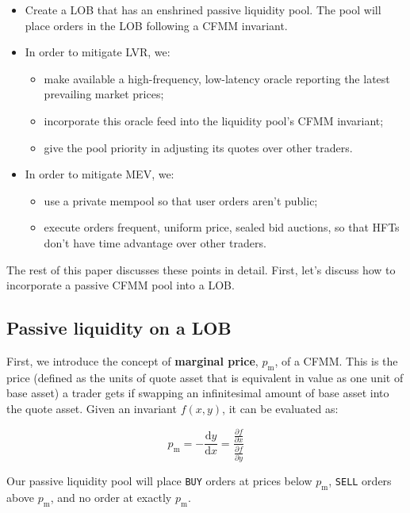 \documentclass{article}
\begin{document}
\begin{itemize}
  \item Create a LOB that has an enshrined passive liquidity pool. The pool will place orders in the LOB following a CFMM invariant.
  \item In order to mitigate LVR, we:
        \begin{itemize}
          \item make available a high-frequency, low-latency oracle reporting the latest prevailing market prices;
          \item incorporate this oracle feed into the liquidity pool's CFMM invariant;
          \item give the pool priority in adjusting its quotes over other traders.
        \end{itemize}
  \item In order to mitigate MEV, we:
        \begin{itemize}
          \item use a private mempool so that user orders aren't public;
          \item execute orders frequent, uniform price, sealed bid auctions, so that HFTs don't have time advantage over other traders.
        \end{itemize}
\end{itemize}

The rest of this paper discusses these points in detail. First, let's discuss how to incorporate a passive CFMM pool into a LOB.

\subsection{Passive liquidity on a LOB}

First, we introduce the concept of \textbf{marginal price}, $p_{\mathrm{m}}$, of a CFMM. This is the price (defined as the units of quote asset that is equivalent in value as one unit of base asset) a trader gets if swapping an infinitesimal amount of base asset into the quote asset. Given an invariant $f(x, y)$, it can be evaluated as:

\begin{equation}
  p_{\mathrm{m}} = - \frac{\mathrm{d}y}{\mathrm{d}x} = \frac{\frac{\partial f}{\partial x}}{\frac{\partial f}{\partial y}}
\end{equation}

Our passive liquidity pool will place \texttt{BUY} orders at prices below $p_{\mathrm{m}}$, \texttt{SELL} orders above $p_{\mathrm{m}}$, and no order at exactly $p_{\mathrm{m}}$.
\end{document}
